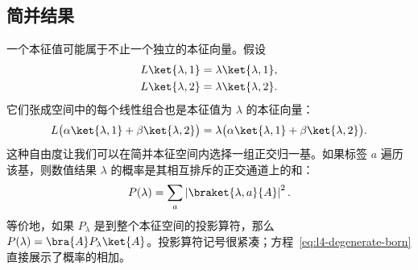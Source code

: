 \begin{classroomqa}
\end{classroomqa}

\begin{classroomqa}
\end{classroomqa}

\begin{classroomqa}
\end{classroomqa}

\subsection{简并结果}

一个本征值可能属于不止一个独立的本征向量。假设
\begin{align}
L\ket{\lambda,1}&=\lambda\ket{\lambda,1},\\
L\ket{\lambda,2}&=\lambda\ket{\lambda,2}.
\end{align}
它们张成空间中的每个线性组合也是本征值为 \(\lambda\) 的本征向量：
\begin{equation}
L\bigl(\alpha\ket{\lambda,1}+\beta\ket{\lambda,2}\bigr)
=
\lambda\bigl(\alpha\ket{\lambda,1}+\beta\ket{\lambda,2}\bigr).
\end{equation}
这种自由度让我们可以在简并本征空间内选择一组正交归一基。如果标签 \(a\) 遍历该基，则数值结果 \(\lambda\) 的概率是其相互排斥的正交通道上的和：
\begin{equation}
P(\lambda)=\sum_a\left|\braket{\lambda,a}{A}\right|^2.
\label{eq:l4-degenerate-born}
\end{equation}
等价地，如果 \(P_\lambda\) 是到整个本征空间的投影算符，那么 \(P(\lambda)=\bra{A}P_\lambda\ket{A}\)。投影算符记号很紧凑；方程~\eqref{eq:l4-degenerate-born}直接展示了概率的相加。

